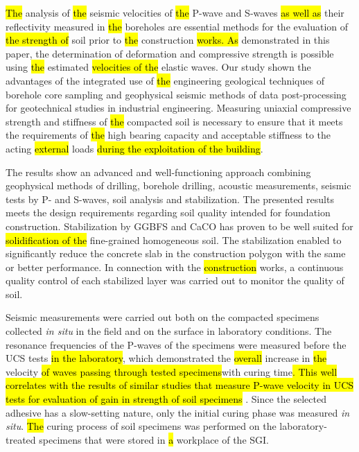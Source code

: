 \documentclass[USenglish,twocolumn]{article}
\begin{document}
\hl{The }analysis of \hl{the }seismic velocities of \hl{the }P-wave and S-waves \hl{as well as} their reflectivity measured in \hl{the }boreholes are essential methods for the evaluation of \hl{the strength of} soil prior to \hl{the }construction \hl{works. As} demonstrated in this paper, the determination of deformation and compressive strength is possible using \hl{the }estimated \hl{velocities of the }elastic waves. Our study shown the advantages of the integrated use of \hl{the }engineering geological techniques of borehole core sampling and geophysical seismic methods of data post-processing for geotechnical studies in industrial engineering. Measuring uniaxial compressive strength and stiffness of \hl{the }compacted soil is necessary to ensure that it meets the requirements of \hl{the }high bearing capacity and acceptable stiffness to the acting \hl{external }loads \hl{during the exploitation of the building}.

The results show an advanced and well-functioning approach combining geophysical methods of drilling, borehole drilling, acoustic measurements, seismic tests by P- and S-waves, soil analysis and stabilization. The presented results meets the design requirements regarding soil quality intended for foundation construction. Stabilization by GGBFS and CaCO has proven to be well suited for\hl{ solidification of the }fine-grained homogeneous soil. The stabilization enabled to significantly reduce the concrete slab in the construction polygon with the same or better performance. In connection with the \hl{construction} works, a continuous quality control of each stabilized layer was carried out to monitor the quality of soil. 

Seismic measurements were carried out both on the compacted specimens collected \emph{in situ} in the field and on the surface in laboratory conditions. The resonance frequencies of the P-waves of the specimens were measured before the UCS tests \hl{in the laboratory}, which demonstrated the \hl{overall }increase in \hl{the }velocity \hl{of waves passing through tested specimens}with curing time\hl{. This well correlates with the results of similar studies that measure P-wave velocity in UCS tests for evaluation of gain in strength of soil specimens }\cite{Aldaood,Lindh202232,Azimian}. Since the selected adhesive has a slow-setting nature, only the initial curing phase was measured \emph{in situ}. \hl{The} curing process of soil specimens was performed on the laboratory-treated specimens that were stored in \hl{a} workplace of the SGI. 
\end{document}
